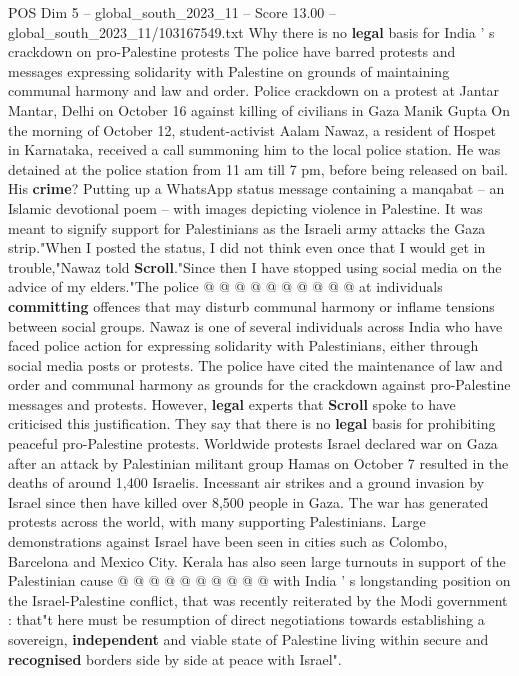 \begin{textsample}{POS Dim 5 – global\_south\_2023\_11 – Score 13.00 – global\_south\_2023\_11/103167549.txt}  \label{ex:f5_pos_277}
Why there is no \textbf{legal} basis for India ' s crackdown on pro-Palestine protests The police have barred protests and messages expressing solidarity with Palestine on grounds of maintaining communal harmony and law and order.
Police crackdown on a protest at Jantar Mantar, Delhi on October 16 against killing of civilians in Gaza Manik Gupta On the morning of October 12, student-activist Aalam Nawaz, a resident of Hospet in Karnataka, received a call summoning him to the local police station.
He was detained at the police station from 11 am till 7 pm, before being released on bail.
His \textbf{crime}?
Putting up a WhatsApp status message containing a manqabat -- an Islamic devotional poem -- with images depicting violence in Palestine.
It was meant to signify support for Palestinians as the Israeli army attacks the Gaza strip."When I posted the status, I did not think even once that I would get in trouble,"Nawaz told \textbf{Scroll}."Since then I have stopped using social media on the advice of my elders."The police @ @ @ @ @ @ @ @ @ @ at individuals \textbf{committing} offences that may disturb communal harmony or inflame tensions between social groups.
Nawaz is one of several individuals across India who have faced police action for expressing solidarity with Palestinians, either through social media posts or protests.
The police have cited the maintenance of law and order and communal harmony as grounds for the crackdown against pro-Palestine messages and protests.
However, \textbf{legal} experts that \textbf{Scroll} spoke to have criticised this justification.
They say that there is no \textbf{legal} basis for prohibiting peaceful pro-Palestine protests.
Worldwide protests Israel declared war on Gaza after an attack by Palestinian militant group Hamas on October 7 resulted in the deaths of around 1,400 Israelis.
Incessant air strikes and a ground invasion by Israel since then have killed over 8,500 people in Gaza.
The war has generated protests across the world, with many supporting Palestinians.
Large demonstrations against Israel have been seen in cities such as Colombo, Barcelona and Mexico City.
Kerala has also seen large turnouts in support of the Palestinian cause @ @ @ @ @ @ @ @ @ @ with India ' s longstanding position on the Israel-Palestine conflict, that was recently reiterated by the Modi government : that"t here must be resumption of direct negotiations towards establishing a sovereign, \textbf{independent} and viable state of Palestine living within secure and \textbf{recognised} borders side by side at peace with Israel".

\end{textsample}
